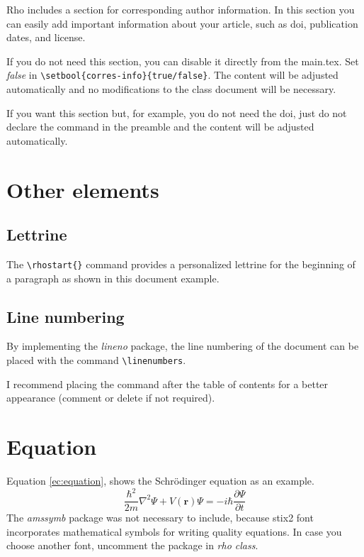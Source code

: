 \documentclass[9pt,a4paper,twoside]{rho-class/rho}
\begin{document}
        Rho includes a section for corresponding author information. In this section you can easily add important information about your article, such as doi, publication dates, and license.

        If you do not need this section, you can disable it directly from the main.tex. Set \textit{false} in \verb|\setbool{corres-info}{true/false}|. The content will be adjusted automatically and no modifications to the class document will be necessary.
        
        If you want this section but, for example, you do not need the doi, just do not declare the command in the preamble and the content will be adjusted automatically.

\section{Other elements}

    \subsection{Lettrine}
    
        The \verb*|\rhostart{}| command provides a personalized lettrine for the beginning of a paragraph as shown in this document example.

    \subsection{Line numbering}

        By implementing the \textit{lineno} package, the line numbering of the document can be placed with the command \verb|\linenumbers|. 
		
        I recommend placing the command after the table of contents for a better appearance (comment or delete if not required).

\section{Equation}

    Equation \ref{ec:equation}, shows the Schrödinger equation as an example. 
        \begin{equation} \label{ec:equation}
            \frac{\hbar^2}{2m}\nabla^2\Psi + V(\mathbf{r})\Psi = -i\hbar \frac{\partial\Psi}{\partial t}
        \end{equation} 
    The \textit{amssymb} package was not necessary to include, because stix2 font incorporates mathematical symbols for writing quality equations. In case you choose another font, uncomment the package in \textit{rho class}.
\end{document}
